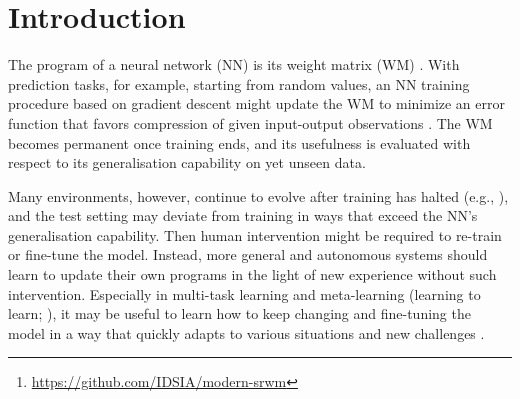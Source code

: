 \documentclass[nohyperref]{article}
\newcommand{\repo}{\url{https://github.com/IDSIA/modern-srwm}}
\theoremstyle{plain}
\theoremstyle{definition}
\theoremstyle{remark}
\begin{document}
\printAffiliationsAndNotice{}  %

\begin{abstract}
The weight matrix (WM) of a neural network (NN) is its program. The programs of many traditional NNs are learned through gradient descent in some error function, then remain fixed. The WM of a self-referential NN, however, can keep rapidly modifying all of itself during runtime. In principle, such NNs can meta-learn to learn, and meta-meta-learn to meta-learn to learn, and so on, in the sense of recursive self-improvement. While NN architectures potentially capable of implementing such behaviour have been proposed since the '90s, there have been few if any practical studies. Here we revisit such NNs, building upon recent successes of fast weight programmers and closely related linear Transformers. We propose a scalable self-referential WM (SRWM) that learns to use outer products and the delta update rule to modify itself. We evaluate our SRWM in supervised few-shot learning and in multi-task reinforcement learning with procedurally generated game environments. Our experiments demonstrate both practical applicability and competitive performance of the proposed SRWM.
Our code is public\footnote[$\dagger$]{\repo}.
\end{abstract}


\section{Introduction}
\label{sec:intro}

The program of a neural network (NN) is its weight matrix (WM) \citep{Schmidhuber:90diffenglish}.
With prediction tasks, for example,
starting from random values, an NN training procedure based on gradient descent might update the WM to minimize an error function that favors compression of given input-output observations \citep{solomonoff1964formal}. The WM becomes permanent once training ends, and its usefulness is evaluated with respect to its generalisation capability on yet unseen data.

Many environments, however, continue to evolve after training has halted (e.g., \citet{lazaridou2021pitfalls, lin2021clear}), and the test setting may deviate from training in ways that exceed the NN's generalisation capability. Then human intervention might be required to re-train or fine-tune the model.
Instead, more general and autonomous systems should learn to update their own programs in the light of new experience without such intervention.
Especially in multi-task learning and meta-learning (learning to learn; \citet{Schmidhuber:87long}), it may be useful to learn how to keep changing and fine-tuning  the model in a way that quickly adapts to various situations and new challenges \citep{hochreiter2001learning, FinnAL17}.
\end{document}
